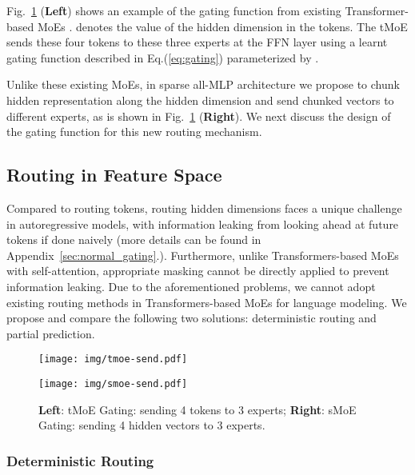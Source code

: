 \documentclass{article}
\begin{document}
Fig.~\ref{fig:moe_smoe} (\textbf{Left}) shows an example of the gating function from existing Transformer-based MoEs \citep{gshard,switch,baselayer,hashlayer}.  denotes the value of the  hidden dimension in the  tokens. The tMoE sends these four tokens to these three experts at the FFN layer using a learnt gating function described in Eq.(\ref{eq:gating}) parameterized by .



Unlike these existing MoEs, in sparse all-MLP architecture we propose to chunk hidden representation along the hidden dimension and send chunked vectors to different experts, as is shown in Fig.~\ref{fig:moe_smoe} (\textbf{Right}). 
We next discuss the design of the gating function for this new routing mechanism. 

\subsection{Routing in Feature Space}
\label{subsec:routing_challenges}
Compared to routing tokens, routing hidden dimensions faces a unique challenge in autoregressive models, with information leaking from looking ahead at future tokens if done naively (more details can be found in Appendix~\ref{sec:normal_gating}.). Furthermore, unlike Transformers-based MoEs with self-attention, appropriate masking cannot be directly applied to prevent information leaking. Due to the aforementioned problems, we cannot adopt existing routing methods in Transformers-based MoEs for language modeling. We propose and compare the following two solutions: deterministic routing and partial prediction. 

\begin{figure}[!t]
   \begin{minipage}{0.24\textwidth}
     \centering
     \texttt{[image: img/tmoe-send.pdf]}
\end{minipage}\hfill
   \begin{minipage}{0.23\textwidth}
     \centering
     \texttt{[image: img/smoe-send.pdf]}
\end{minipage}
   \caption{\textbf{Left}: tMoE Gating: sending 4 tokens to 3 experts; \textbf{Right}: sMoE Gating: sending 4 hidden vectors to 3 experts.}
   \label{fig:moe_smoe}
\end{figure}




\subsubsection{Deterministic Routing}
\label{sec:deterministic routing}
\end{document}
